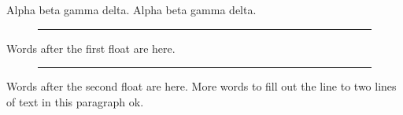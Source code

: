 \documentclass{article}
\begin{document}
Alpha beta gamma delta. Alpha beta gamma delta.
\begin{figure}[b]
\rule{4cm}{1cm}
\end{figure}
Words after the first float are here.
\begin{figure}[b]
\rule{4cm}{1cm}
\end{figure}
Words after the second float are here. More words to fill out the line to two lines of text in this paragraph ok.
\end{document}
